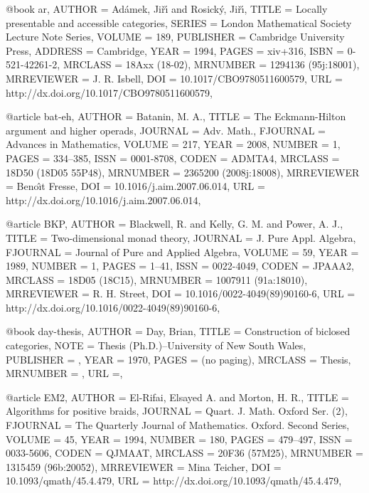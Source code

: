@book {ar,
    AUTHOR = {Ad{\'a}mek, Ji{\v{r}}{\'{\i}} and Rosick{\'y},
              Ji{\v{r}}{\'{\i}}},
     TITLE = {Locally presentable and accessible categories},
    SERIES = {London Mathematical Society Lecture Note Series},
    VOLUME = {189},
 PUBLISHER = {Cambridge University Press},
   ADDRESS = {Cambridge},
      YEAR = {1994},
     PAGES = {xiv+316},
      ISBN = {0-521-42261-2},
   MRCLASS = {18Axx (18-02)},
  MRNUMBER = {1294136 (95j:18001)},
MRREVIEWER = {J. R. Isbell},
       DOI = {10.1017/CBO9780511600579},
       URL = {http://dx.doi.org/10.1017/CBO9780511600579},
}

@article {bat-eh,
    AUTHOR = {Batanin, M. A.},
     TITLE = {The {E}ckmann-{H}ilton argument and higher operads},
   JOURNAL = {Adv. Math.},
  FJOURNAL = {Advances in Mathematics},
    VOLUME = {217},
      YEAR = {2008},
    NUMBER = {1},
     PAGES = {334--385},
      ISSN = {0001-8708},
     CODEN = {ADMTA4},
   MRCLASS = {18D50 (18D05 55P48)},
  MRNUMBER = {2365200 (2008j:18008)},
MRREVIEWER = {Beno\^ {\i}t Fresse},
       DOI = {10.1016/j.aim.2007.06.014},
       URL = {http://dx.doi.org/10.1016/j.aim.2007.06.014},
}

@article {BKP,
    AUTHOR = {Blackwell, R. and Kelly, G. M. and Power, A. J.},
     TITLE = {Two-dimensional monad theory},
   JOURNAL = {J. Pure Appl. Algebra},
  FJOURNAL = {Journal of Pure and Applied Algebra},
    VOLUME = {59},
      YEAR = {1989},
    NUMBER = {1},
     PAGES = {1--41},
      ISSN = {0022-4049},
     CODEN = {JPAAA2},
   MRCLASS = {18D05 (18C15)},
  MRNUMBER = {1007911 (91a:18010)},
MRREVIEWER = {R. H. Street},
       DOI = {10.1016/0022-4049(89)90160-6},
       URL = {http://dx.doi.org/10.1016/0022-4049(89)90160-6},
}

@book {day-thesis,
    AUTHOR = {Day, Brian},
     TITLE = {Construction of biclosed categories},
      NOTE = {Thesis (Ph.D.)--University of New South Wales},
 PUBLISHER = {},
      YEAR = {1970},
     PAGES = {(no paging)},
   MRCLASS = {Thesis},
  MRNUMBER = {},
       URL ={},
       }

@article {EM2,
    AUTHOR = {El-Rifai, Elsayed A. and Morton, H. R.},
     TITLE = {Algorithms for positive braids},
   JOURNAL = {Quart. J. Math. Oxford Ser. (2)},
  FJOURNAL = {The Quarterly Journal of Mathematics. Oxford. Second Series},
    VOLUME = {45},
      YEAR = {1994},
    NUMBER = {180},
     PAGES = {479--497},
      ISSN = {0033-5606},
     CODEN = {QJMAAT},
   MRCLASS = {20F36 (57M25)},
  MRNUMBER = {1315459 (96b:20052)},
MRREVIEWER = {Mina Teicher},
       DOI = {10.1093/qmath/45.4.479},
       URL = {http://dx.doi.org/10.1093/qmath/45.4.479},
}

